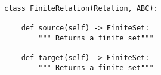 \begin{verbatim}
class FiniteRelation(Relation, ABC):

    def source(self) -> FiniteSet:
        """ Returns a finite set"""

    def target(self) -> FiniteSet:
        """ Returns a finite set"""
\end{verbatim}